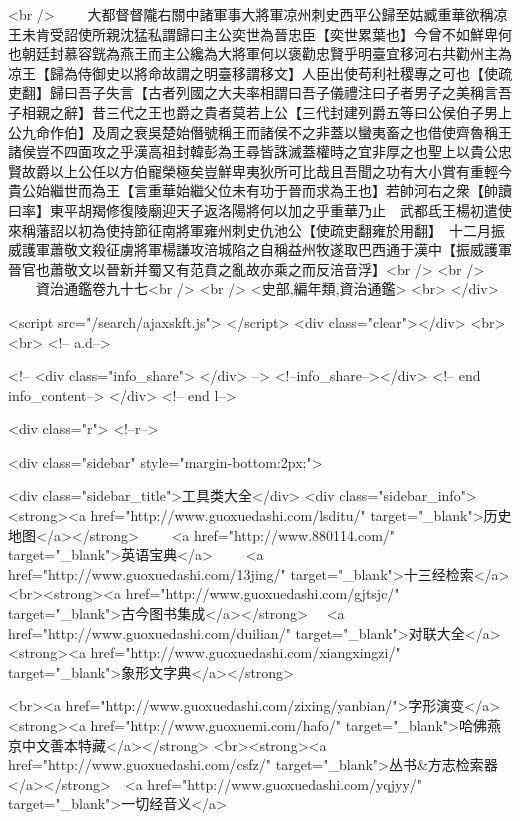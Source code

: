 <br />
　　大都督督隴右關中諸軍事大將軍凉州刺史西平公歸至姑臧重華欲稱凉王未肯受詔使所親沈猛私謂歸曰主公奕世為晉忠臣【奕世累葉也】今曾不如鮮卑何也朝廷封慕容皝為燕王而主公纔為大將軍何以褒勸忠賢乎明臺宜移河右共勸州主為凉王【歸為侍御史以將命故謂之明臺移謂移文】人臣出使苟利社稷專之可也【使疏吏翻】歸曰吾子失言【古者列國之大夫率相謂曰吾子儀禮注曰子者男子之美稱言吾子相親之辭】昔三代之王也爵之貴者莫若上公【三代封建列爵五等曰公侯伯子男上公九命作伯】及周之衰吳楚始僭號稱王而諸侯不之非蓋以蠻夷畜之也借使齊魯稱王諸侯豈不四面攻之乎漢高祖封韓彭為王尋皆誅滅蓋權時之宜非厚之也聖上以貴公忠賢故爵以上公任以方伯寵榮極矣豈鮮卑夷狄所可比哉且吾聞之功有大小賞有重輕今貴公始繼世而為王【言重華始繼父位未有功于晉而求為王也】若帥河右之衆【帥讀曰率】東平胡羯修復陵廟迎天子返洛陽將何以加之乎重華乃止　武都氐王楊初遣使來稱藩詔以初為使持節征南將軍雍州刺史仇池公【使疏吏翻雍於用翻】　十二月振威護軍蕭敬文殺征虜將軍楊謙攻涪城陷之自稱益州牧遂取巴西通于漢中【振威護軍晉官也蕭敬文以晉新并蜀又有范賁之亂故亦乘之而反涪音浮】<br />
<br />
　　資治通鑑卷九十七<br />
<br />
<史部,編年類,資治通鑑>  <br>
   </div> 

<script src="/search/ajaxskft.js"> </script>
 <div class="clear"></div>
<br>
<br>
 <!-- a.d-->

 <!--
<div class="info_share">
</div> 
-->
 <!--info_share--></div>   <!-- end info_content-->
  </div> <!-- end l-->

<div class="r">   <!--r-->



<div class="sidebar"  style="margin-bottom:2px;">

 
<div class="sidebar_title">工具类大全</div>
<div class="sidebar_info">
<strong><a href="http://www.guoxuedashi.com/lsditu/" target="_blank">历史地图</a></strong>　　
<a href="http://www.880114.com/" target="_blank">英语宝典</a>　　
<a href="http://www.guoxuedashi.com/13jing/" target="_blank">十三经检索</a>　
<br><strong><a href="http://www.guoxuedashi.com/gjtsjc/" target="_blank">古今图书集成</a></strong>　
<a href="http://www.guoxuedashi.com/duilian/" target="_blank">对联大全</a>　<strong><a href="http://www.guoxuedashi.com/xiangxingzi/" target="_blank">象形文字典</a></strong>　

<br><a href="http://www.guoxuedashi.com/zixing/yanbian/">字形演变</a>　　<strong><a href="http://www.guoxuemi.com/hafo/" target="_blank">哈佛燕京中文善本特藏</a></strong>
<br><strong><a href="http://www.guoxuedashi.com/csfz/" target="_blank">丛书&方志检索器</a></strong>　<a href="http://www.guoxuedashi.com/yqjyy/" target="_blank">一切经音义</a>　　

